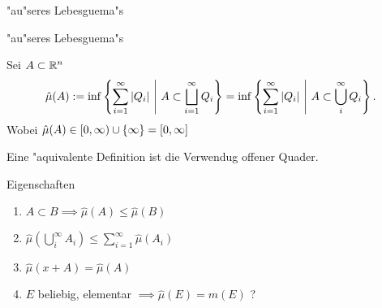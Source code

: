 \documentclass[class=article, crop=false]{standalone}
\begin{document}
\begin{zettel}{"au"seres Lebesguema"s}
\begin{flashcard}[cvit2hk5]{"au"seres Lebesguema"s}
	\begin{definition}
		Sei $A \subset \mathbb{R}^n$
		\[
			\hat{\mu }(A) := \inf \set{\sum_{i = 1}^{\infty} |Q_i |}{A \subset  \bigsqcup_{i=1}^{\infty} Q_i} = \inf \set{\sum_{i = 1}^{\infty} |Q_i |}{A \subset  \bigcup_i^{\infty} Q_i}
		.\]
		Wobei $\hat{\mu }(A) \in  [0, \infty) \cup \set{\infty} = [0,\infty]$
	\end{definition}
	Eine "aquivalente Definition ist die Verwendug offener Quader.
\end{flashcard}

Eigenschaften
\begin{enumerate}
	\item $A \subset  B \implies \hat{\mu }(A) \leq  \hat{\mu }(B)$
	\item $\hat{\mu }(\bigcup_i^{\infty}A_i ) \leq  \sum_{i = 1}^{\infty} \hat{\mu }(A_i) $
	\item $\hat{\mu }(x + A) = \hat{\mu }(A)$
	\item $E$ beliebig, elementar $\implies \hat{\mu }(E)= m(E)$ ?
\end{enumerate}
\end{zettel}
\end{document}
